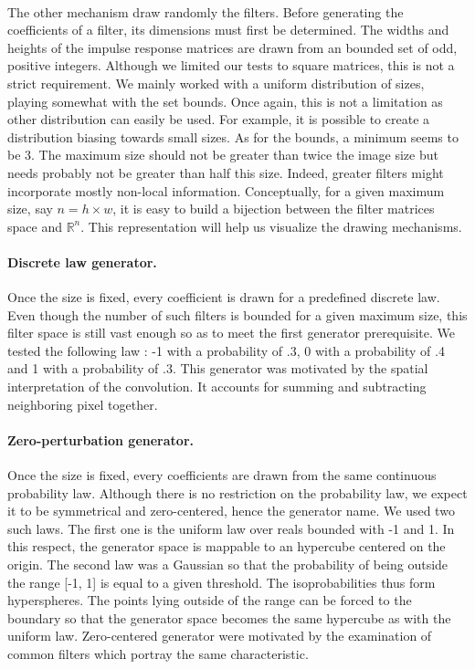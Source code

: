 \documentclass[a4paper]{report}
\begin{document}
			\paragraph{}
			The other mechanism draw randomly the filters. Before generating the coefficients of a filter, its dimensions must first be determined. The widths and heights of the impulse response matrices are drawn from an bounded set of odd, positive integers. Although we limited our tests to square matrices, this is not a strict requirement.
			We mainly worked with a uniform distribution of sizes, playing somewhat with the set bounds. Once again, this is not a limitation as other distribution can easily be used. For example, it is possible to create a distribution biasing towards small sizes. 
			As for the bounds, a minimum seems to be 3. The maximum size should not be greater than twice the image size but needs probably not be greater than half this size. Indeed, greater filters might incorporate mostly non-local information.
			Conceptually, for a given maximum size, say $n = h \times w$, it is easy to build a bijection between the filter matrices space and $\mathbb{R}^n$. This representation will help us visualize the drawing mechanisms.
			\paragraph{Discrete law generator.}
			Once the size is fixed, every coefficient is drawn for a predefined discrete law. Even though the number of such filters is bounded for a given maximum size, this filter space is still vast enough so as to meet the first generator prerequisite. We tested the following law : -1 with a probability of .3, 0 with a probability of .4 and 1 with a probability of .3.
			This generator was motivated by the spatial interpretation of the convolution. It accounts for summing and subtracting neighboring pixel together.
			\paragraph{Zero-perturbation generator.}
			Once the size is fixed, every coefficients are drawn from the same continuous probability law. Although there is no restriction on the probability law, we expect it to be symmetrical and zero-centered, hence the generator name. We used two such laws. The first one is the uniform law over reals bounded with -1 and 1. In this respect, the generator space is mappable to an hypercube centered on the origin. The second law was a Gaussian so that the probability of being outside the range [-1, 1] is equal to a given threshold. The isoprobabilities thus form hyperspheres. The points lying outside of the range can be forced to the boundary so that the generator space becomes the same hypercube as with the uniform law. 
			Zero-centered generator were motivated by the examination of common filters which portray the same characteristic.
\end{document}
